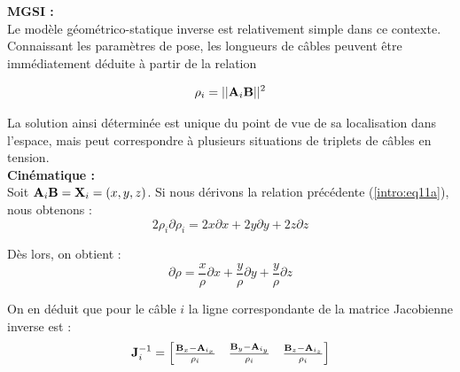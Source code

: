 {\bf MGSI :}\\

Le mod\`ele g\'eom\'etrico-statique inverse est relativement simple dans ce 
contexte. Connaissant les param\`etres de pose, les longueurs de c\^ables 
peuvent \^etre imm\'ediatement d\'eduite \`a partir de la relation 

\begin{equation}
\rho_i = ||{\bf A}_i{\bf B}||^2
\label{intro:eq11a}
\end{equation}

La solution ainsi d\'etermin\'ee est unique du point de vue de sa localisation 
dans l'espace, mais peut correspondre \`a plusieurs situations de triplets de 
c\^ables en tension.\\

{\bf Cin\'ematique :}\\

Soit ${\bf A}_i{\bf B} = {\bf X}_i = (x, y, z)$. Si nous d\'erivons la relation 
pr\'ec\'edente (\ref{intro:eq11a}), nous obtenons :
\begin{equation}
2 \rho_i \partial \rho_i = 2 x \partial x + 2 y \partial y + 2 z \partial z
\label{intro:eq11a2}
\end{equation}

D\`es lors, on obtient :
\begin{equation}
\partial \rho = \frac x \rho \partial x + \frac y \rho \partial y + \frac y 
\rho \partial z
\label{intro:eq11a3}
\end{equation}

On en d\'eduit que pour le c\^able $i$ la ligne correspondante de la 
matrice Jaco\-bienne inverse est :
\begin{equation}
{\bf J}^{-1}_i = 
\begin{bmatrix}
\frac {{\bf B}_x - {\bf A}_{i_x}} {\rho_i} & \frac {{\bf B}_y - {\bf A}_{i_y}} 
{\rho_i} & \frac {{\bf B}_z - {\bf A}_{i_z}} {\rho_i} 
\end{bmatrix}
\label{intro:eq11a4}
\end{equation}




\vfill